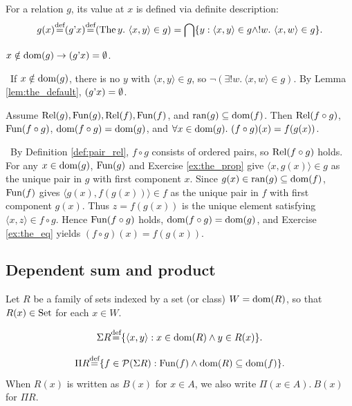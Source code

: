 \documentclass[10pt,a4paper]{article}
\begin{document}
For a relation $g$, its value at $x$ is defined via definite description:
$$g(x) {\stackrel{{\textrm{def}}}{=}} (g{\textrm{'}} x) {\stackrel{{\textrm{def}}}{=}} ({\textrm{The\,}} y.\ \langle x, y\rangle \in g) = {\bigcap} \{y : \langle x,y\rangle \in g \land !w.\ \langle x,w\rangle \in g\}.$$

\begin{exercise}
$x\notin {\textrm{dom}}(g)\to (g{\textrm{'}} x)=\emptyset$.
\end{exercise}
\myprf\ If $x \notin {\textrm{dom}}(g)$, there is no $y$ with $\langle x,y\rangle \in g$, so $\neg(\exists !w.\ \langle x,w\rangle \in g)$. By Lemma \ref{lem:the_default}, $(g{\textrm{'}} x) = \emptyset$. \myqed

\begin{lemma}\label{lem:fun_comp}
Assume ${\textrm{Rel}}(g), {\textrm{Fun}}(g), {\textrm{Rel}}(f), {\textrm{Fun}}(f)$, and $\textrm{ran}(g) \subseteq {\textrm{dom}}(f)$. Then ${\textrm{Rel}}(f \circ g)$, ${\textrm{Fun}}(f \circ g)$, ${\textrm{dom}}(f \circ g) = {\textrm{dom}}(g)$, and $\forall x \in {\textrm{dom}}(g).\ (f \circ g)(x) = f(g(x))$.
\end{lemma}
\myprf\ By Definition \ref{def:pair_rel}, $f \circ g$ consists of ordered pairs, so ${\textrm{Rel}}(f \circ g)$ holds. For any $x \in {\textrm{dom}}(g)$, ${\textrm{Fun}}(g)$ and Exercise \ref{ex:the_prop} give $\langle x, g(x) \rangle \in g$ as the unique pair in $g$ with first component $x$. Since $g(x) \in \textrm{ran}(g) \subseteq {\textrm{dom}}(f)$, ${\textrm{Fun}}(f)$ gives $\langle g(x), f(g(x)) \rangle \in f$ as the unique pair in $f$ with first component $g(x)$. Thus $z = f(g(x))$ is the unique element satisfying $\langle x, z \rangle \in f \circ g$. Hence ${\textrm{Fun}}(f \circ g)$ holds, ${\textrm{dom}}(f \circ g) = {\textrm{dom}}(g)$, and Exercise \ref{ex:the_eq} yields $(f \circ g)(x) = f(g(x))$. \myqed

\subsection{Dependent sum and product}
Let $R$ be a family of sets indexed by a set (or class) $W = {\textrm{dom}}(R)$, so that $R(x) \in {\textrm{Set}}$ for each $x \in W$.
\begin{definition}
$$\Sigma R {\stackrel{{\textrm{def}}}{=}} \{\langle x, y\rangle : x \in {\textrm{dom}}(R) \land y\in R(x)\}.$$
\end{definition}
\begin{definition}
$$\Pi R {\stackrel{{\textrm{def}}}{=}} \{ f\in {\mathcal{P}}(\Sigma R) : {\textrm{Fun}}(f) \land {\textrm{dom}}(R)\subseteq {\textrm{dom}}(f)\}.$$
When $R(x)$ is written as $B(x)$ for $x \in A$, we also write $\Pi(x \in A).\ B(x)$ for $\Pi R$.
\end{definition}
\end{document}
